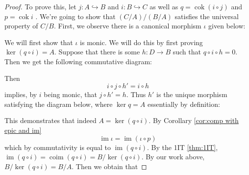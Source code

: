 \documentclass{article}
\DeclareMathOperator{\im}{im}
\DeclareMathOperator{\coim}{coim}
\DeclareMathOperator{\cok}{cok}
\begin{document}
\begin{proof}
    To prove this, let $j:A\hookrightarrow B$ and $i: B\hookrightarrow C$ as well as $q=\cok (i\circ j)$ and $p=\cok i$ . We're going to show that $(C/A)/(B/A)$ satisfies the universal property of $C/B$. First, we observe there is a canonical morphism $\iota$ given below:
    \begin{center}
    \end{center}
    We will first show that $\iota$ is monic. We will do this by first proving $\ker(q\circ i)=A$. Suppose that there is some $h:D\to B$ such that $q\circ i\circ h=0$. Then we get the following commutative diagram:
    \begin{center}
    \end{center}
    Then
    \[
    i\circ j\circ h'=i\circ h
    \]
    implies, by $i$ being monic, that $j\circ h'=h$. Thus $h'$ is the unique morphism satisfying the diagram below, where $\ker q=A$ essentially by definition:
    \begin{center}
    \end{center}
    This demonstrates that indeed $A=\ker(q\circ i)$. By Corollary \ref{cor:comp with epic and im}
    \[
    \im \iota=\im(\iota \circ p)
    \]
    which by commutativity is equal to $\im(q\circ i)$. By the 1IT \ref{thm:1IT}, $\im(q\circ i)=\coim(q\circ i)=B/\ker(q\circ i)$. By our work above, $B/\ker(q\circ i)=B/A$. Then we obtain that

\end{proof}
\end{document}
